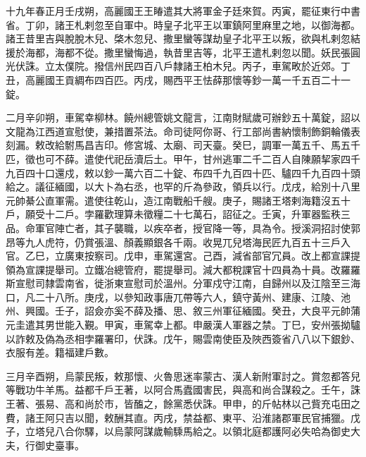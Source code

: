 
\begin{pinyinscope}

 十九年春正月壬戌朔，高麗國王王睶遣其大將軍金子廷來賀。丙寅，罷征東行中書省。丁卯，諸王札剌忽至自軍中。時皇子北平王以軍鎮阿里麻里之地，以御海都。諸王昔里吉與脫脫木兒、棨木忽兒、撒里蠻等謀劫皇子北平王以叛，欲與札剌忽結援於海都，海都不從。撒里蠻悔過，執昔里吉等，北平王遣札剌忽以聞。妖民張圓光伏誅。立太僕院。撥信州民四百八戶隸諸王柏木兒。丙子，車駕畋於近郊。丁丑，高麗國王貢綢布四百匹。丙戌，賜西平王怯薛那懷等鈔一萬一千五百二十一錠。



 二月辛卯朔，車駕幸柳林。饒州總管姚文龍言，江南財賦歲可辦鈔五十萬錠，詔以文龍為江西道宣慰使，兼措置茶法。命司徒阿你哥、行工部尚書納懷制飾銅輪儀表刻漏。敕改給駙馬昌吉印。修宮城、太廟、司天臺。癸巳，調軍一萬五千、馬五千匹，徵也可不薛。遣使代祀岳瀆后土。甲午，甘州逃軍二千二百人自陳願挈家四千九百四十口還戍，敕以鈔一萬六百二十錠、布四千九百四十匹、驢四千九百四十頭給之。議征緬國，以大卜為右丞，也罕的斤為參政，領兵以行。戊戌，給別十八里元帥綦公直軍需。遣使往乾山，造江南戰船千艘。庚子，賜諸王塔剌海籍沒五十戶，願受十二戶。孛羅歡理算未徵糧二十七萬石，詔征之。壬寅，升軍器監秩三品。命軍官陣亡者，其子襲職，以疾卒者，授官降一等，具為令。授溪洞招討使郭昂等九人虎符，仍賞張溫、顏義顯銀各千兩。收晃兀兒塔海民匠九百五十三戶入官。乙巳，立廣東按察司。戊申，車駕還宮。己酉，減省部官冗員。改上都宣課提領為宣課提舉司。立鐵冶總管府，罷提舉司。減大都稅課官十四員為十員。改羅羅斯宣慰司隸雲南省，徙浙東宣慰司於溫州。分軍戍守江南，自歸州以及江陰至三海口，凡二十八所。庚戌，以參知政事唐兀帶等六人，鎮守黃州、建康、江陵、池州、興國。壬子，詔僉亦奚不薛及播、思、敘三州軍征緬國。癸丑，大良平元帥蒲元圭遣其男世能入覲。甲寅，車駕幸上都。申嚴漢人軍器之禁。丁巳，安州張拗驢以詐敕及偽為丞相孛羅署印，伏誅。戊午，賜雲南使臣及陜西簽省八八以下銀鈔、衣服有差。籍福建戶數。



 三月辛酉朔，烏蒙民叛，敕那懷、火魯思迷率蒙古、漢人新附軍討之。賞忽都答兒等戰功牛羊馬。益都千戶王著，以阿合馬蠹國害民，與高和尚合謀殺之。壬午，誅王著、張易、高和尚於市，皆醢之，餘黨悉伏誅。甲申，的斤帖林以己貲充屯田之費，諸王阿只吉以聞，敕酬其直。丙戌，禁益都、東平、沿淮諸郡軍民官捕獵。戊子，立塔兒八合你驛，以烏蒙阿謀歲輸騬馬給之。以領北庭都護阿必失哈為御史大夫，行御史臺事。




\end{pinyinscope}
